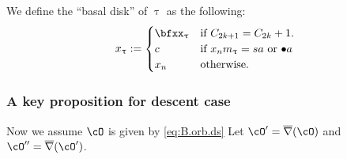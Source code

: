 \documentclass[12pt,a4paper]{amsart}
\def\eDD{\overline{\nabla}}
\numberwithin{equation}{section}
\theoremstyle{remark}
\def\cOp{\cO^{\prime}}
\def\cOpp{\cO^{\prime\prime}}
\begin{document}
We define the  ``basal disk'' of $\uptau$ as the following:
\[
  x_{\uptau} :=\begin{cases}
    \bfxx_{\uptau} & \text{if $C_{2k+1}=C_{2k}+1$}.\\
    c & \text{if $x_{n}m_{\uptau} =sa$ or $\bullet a$}\\
    x_{n} & \text{otherwise}. %
  \end{cases}
\]


\subsubsection{A key proposition for descent case}
Now we assume $\cO$ is given by \eqref{eq:B.orb.ds}
Let $\cOp=\eDD(\cO)$ and $\cOpp=\eDD(\cOp)$.
\end{document}
